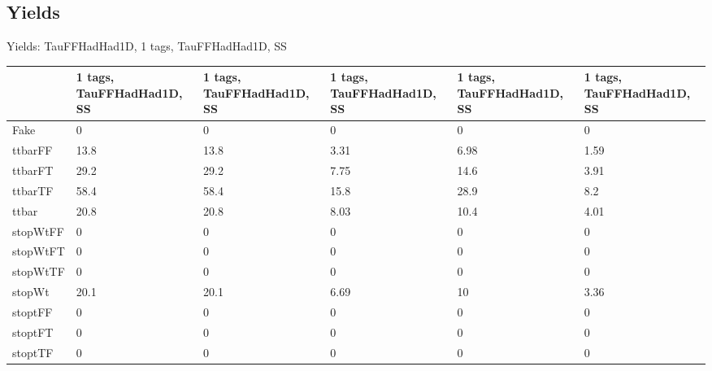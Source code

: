 
\subsection{Yields}

\begin{frame}{Yields: TauFFHadHad1D, 1 tags, TauFFHadHad1D, SS}
\begin{center}
  \begin{tabular}{l| >{\centering\let\newline\\\arraybackslash\hspace{0pt}}m{1.4cm}| >{\centering\let\newline\\\arraybackslash\hspace{0pt}}m{1.4cm}| >{\centering\let\newline\\\arraybackslash\hspace{0pt}}m{1.4cm}| >{\centering\let\newline\\\arraybackslash\hspace{0pt}}m{1.4cm}| >{\centering\let\newline\\\arraybackslash\hspace{0pt}}m{1.4cm}}
    & 1 tags, TauFFHadHad1D, SS & 1 tags, TauFFHadHad1D, SS & 1 tags, TauFFHadHad1D, SS & 1 tags, TauFFHadHad1D, SS & 1 tags, TauFFHadHad1D, SS \\
 \hline \hline
    Fake& 0 & 0 & 0 & 0 & 0 \\
 \hline
    ttbarFF& 13.8 & 13.8 & 3.31 & 6.98 & 1.59 \\
 \hline
    ttbarFT& 29.2 & 29.2 & 7.75 & 14.6 & 3.91 \\
 \hline
    ttbarTF& 58.4 & 58.4 & 15.8 & 28.9 & 8.2 \\
 \hline
    ttbar& 20.8 & 20.8 & 8.03 & 10.4 & 4.01 \\
 \hline
    stopWtFF& 0 & 0 & 0 & 0 & 0 \\
 \hline
    stopWtFT& 0 & 0 & 0 & 0 & 0 \\
 \hline
    stopWtTF& 0 & 0 & 0 & 0 & 0 \\
 \hline
    stopWt& 20.1 & 20.1 & 6.69 & 10 & 3.36 \\
 \hline
    stoptFF& 0 & 0 & 0 & 0 & 0 \\
 \hline
    stoptFT& 0 & 0 & 0 & 0 & 0 \\
 \hline
    stoptTF& 0 & 0 & 0 & 0 & 0 \\

\end{tabular}
\end{center}
\end{frame}
